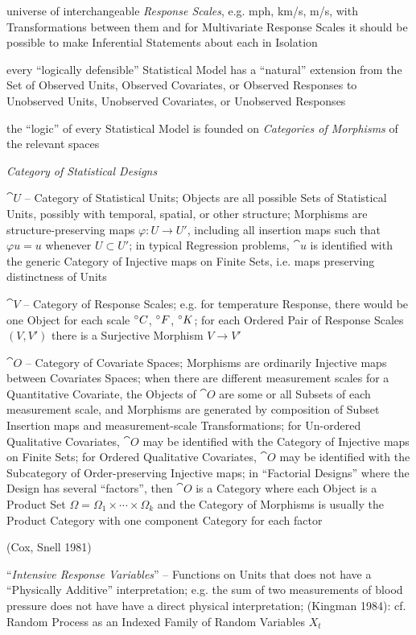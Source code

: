 universe of interchangeable \emph{Response Scales}, e.g. mph, km/s, m/s, with
Transformations between them and for Multivariate Response Scales it should be
possible to make Inferential Statements about each in Isolation

every ``logically defensible'' Statistical Model has a ``natural'' extension
from the Set of Observed Units, Observed Covariates, or Observed Responses to
Unobserved Units, Unobserved Covariates, or Unobserved Responses

the ``logic'' of every Statistical Model is founded on \emph{Categories of
  Morphisms} of the relevant spaces

\emph{Category of Statistical Designs}

$\cat{U}$ -- Category of Statistical Units; Objects are all possible Sets of
Statistical Units, possibly with temporal, spatial, or other structure;
Morphisms are structure-preserving maps $\varphi : U \to U'$, including all
insertion maps such that $\varphi u = u$ whenever $U \subset U'$; in typical
Regression problems, $\cat{u}$ is identified with the generic Category of
Injective maps on Finite Sets, i.e. maps preserving distinctness of Units

$\cat{V}$ -- Category of Response Scales; e.g. for temperature Response, there
would be one Object for each scale $^{\circ} C$, $^{\circ} F$, $^{\circ} K$; for
each Ordered Pair of Response Scales $(V, V')$ there is a Surjective Morphism
$V \to V'$

$\cat{O}$ -- Category of Covariate Spaces; Morphisms are ordinarily
Injective maps between Covariates Spaces; when there are different measurement
scales for a Quantitative Covariate, the Objects of $\cat{O}$ are some or
all Subsets of each measurement scale, and Morphisms are generated by
composition of Subset Insertion maps and measurement-scale Transformations; for
Un-ordered Qualitative Covariates, $\cat{O}$ may be identified with the
Category of Injective maps on Finite Sets; for Ordered Qualitative Covariates,
$\cat{O}$ may be identified with the Subcategory of Order-preserving
Injective maps; in ``Factorial Designs'' where the Design has several
``factors'', then $\cat{O}$ is a Category where each Object is a Product
Set $\Omega = \Omega_1 \times \cdots \times \Omega_k$ and the Category of
Morphisms is usually the Product Category with one component Category for each
factor

(Cox, Snell 1981)

``\emph{Intensive Response Variables}'' -- Functions on Units that does not have
a ``Physically Additive'' interpretation; e.g. the sum of two measurements of
blood pressure does not have have a direct physical interpretation;
(Kingman 1984): cf. Random Process as an Indexed Family of Random Variables
$X_t$

